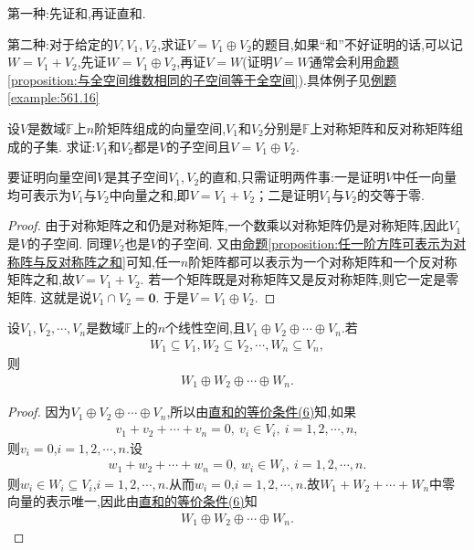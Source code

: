 \documentclass[../../main.tex]{subfiles}
\begin{document}
第一种:先证和,再证直和. 

第二种:对于给定的\(V,V_1,V_2\),求证\(V = V_1\oplus V_2\)的题目,如果“和”不好证明的话,可以记\(W = V_1 + V_2\),先证\(W = V_1\oplus V_2\),再证\(V = W\)(证明\(V = W\)通常会利用\hyperref[proposition:与全空间维数相同的子空间等于全空间]{命题\ref{proposition:与全空间维数相同的子空间等于全空间}}).具体例子见\hyperref[example:561.16]{例题\ref{example:561.16}}

\begin{proposition}\label{proposition:矩阵空间可以分解为对称和反称矩阵空间的直和}
设\(V\)是数域\(\mathbb{F}\)上\(n\)阶矩阵组成的向量空间,\(V_1\)和\(V_2\)分别是\(\mathbb{F}\)上对称矩阵和反对称矩阵组成的子集. 求证:\(V_1\)和\(V_2\)都是\(V\)的子空间且\(V = V_1\oplus V_2\).
\end{proposition}
\begin{note}
要证明向量空间\(V\)是其子空间\(V_1,V_2\)的直和,只需证明两件事:一是证明\(V\)中任一向量均可表示为\(V_1\)与\(V_2\)中向量之和,即\(V = V_1 + V_2\)；二是证明\(V_1\)与\(V_2\)的交等于零.
\end{note}
\begin{proof}
由于对称矩阵之和仍是对称矩阵,一个数乘以对称矩阵仍是对称矩阵,因此\(V_1\)是\(V\)的子空间. 同理\(V_2\)也是\(V\)的子空间. 又由\hyperref[proposition:任一阶方阵可表示为对称阵与反对称阵之和]{命题\ref{proposition:任一阶方阵可表示为对称阵与反对称阵之和}}可知,任一\(n\)阶矩阵都可以表示为一个对称矩阵和一个反对称矩阵之和,故\(V = V_1 + V_2\). 若一个矩阵既是对称矩阵又是反对称矩阵,则它一定是零矩阵. 这就是说\(V_1\cap V_2 =\mathbf{0}\). 于是\(V = V_1\oplus V_2\). 
\end{proof}

\begin{proposition}\label{proposition:直和分解的每个子空间的和还是直和}
设$V_1,V_2,\cdots,V_n$是数域$\mathbb{F}$上的$n$个线性空间,且$V_1\oplus V_2\oplus \cdots \oplus V_n$.若
\begin{align*}
W_1\subseteq V_1,W_2\subseteq V_2,\cdots ,W_n\subseteq V_n,
\end{align*}
则
\begin{align*}
W_1\oplus W_2\oplus \cdots \oplus W_n.
\end{align*}
\end{proposition}
\begin{proof}
因为$V_1\oplus V_2\oplus \cdots \oplus V_n$,所以由\hyperref[theorem:直和的等价条件]{直和的等价条件(6)}知,如果
\begin{align*}
v_1+v_2+\cdots +v_n=0,\ v_i\in V_i,\ i=1,2,\cdots,n,
\end{align*}
则$v_i=0$,$i=1,2,\cdots,n$.设
\begin{align*}
w_1+w_2+\cdots +w_n=0,\ w_i\in W_i,\ i=1,2,\cdots,n.
\end{align*}
则$w_i\in W_i\subseteq V_i$,$i=1,2,\cdots,n$.从而$w_i=0$,$i=1,2,\cdots,n$.故$W_1+W_2+\cdots +W_n$中零向量的表示唯一,因此由\hyperref[theorem:直和的等价条件]{直和的等价条件(6)}知
\begin{align*}
W_1\oplus W_2\oplus \cdots \oplus W_n.
\end{align*}
\end{proof}
\end{document}
